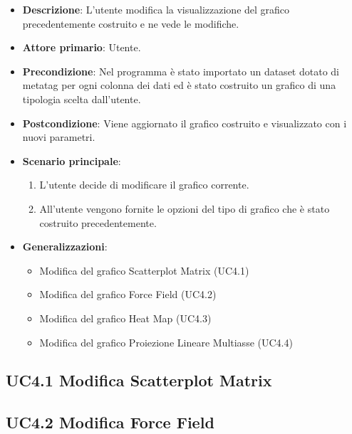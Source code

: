 \begin{itemize}
    \item \textbf{Descrizione}: L’utente modifica la visualizzazione del grafico precedentemente costruito
                                e ne vede le modifiche.
	
    \item \textbf{Attore primario}: Utente.
    
    \item \textbf{Precondizione}:   Nel programma è stato importato un dataset dotato di metatag per ogni
                                    colonna dei dati ed è stato costruito un grafico di una tipologia scelta dall'utente.

    \item \textbf{Postcondizione}:  Viene aggiornato il grafico costruito e visualizzato con i nuovi parametri.

	\item \textbf{Scenario principale}:
		\begin{enumerate}
			\item L'utente decide di modificare il grafico corrente.
			\item All'utente vengono fornite le opzioni del tipo di grafico che è stato costruito precedentemente.
        \end{enumerate}

    \item \textbf{Generalizzazioni}:
        \begin{itemize}
            \item Modifica del grafico Scatterplot Matrix (UC4.1)
            \item Modifica del grafico Force Field (UC4.2)
            \item Modifica del grafico Heat Map (UC4.3)
            \item Modifica del grafico Proiezione Lineare Multiasse (UC4.4)
        \end{itemize}
\end{itemize}


\subsection{UC4.1 Modifica Scatterplot Matrix}

\subsection{UC4.2 Modifica Force Field}
